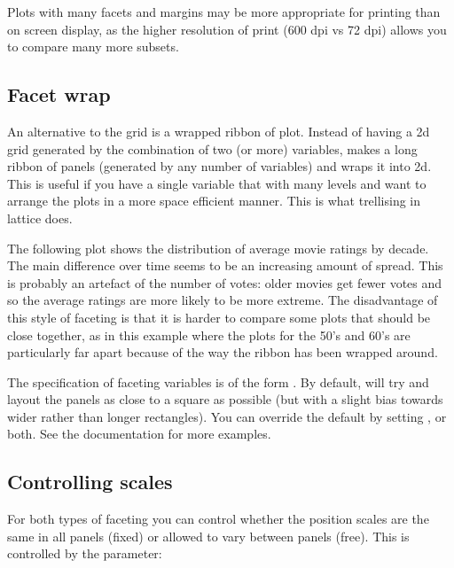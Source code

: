 Plots with many facets and margins may be more appropriate for printing than on screen display, as the higher resolution of print (600 dpi vs 72 dpi) allows you to compare many more subsets.

\subsection{Facet wrap}
\label{sub:facet_wrap}

An alternative to the grid is a wrapped ribbon of plot.  Instead of having a 2d grid generated by the combination of two (or more) variables,  makes a long ribbon of panels (generated by any number of variables) and wraps it into 2d.  This is useful if you have a single variable that with many levels and want to arrange the plots in a more space efficient manner.  This is what trellising in lattice does.

The following plot shows the distribution of average movie ratings by decade.  The main difference over time seems to be an increasing amount of spread.  This is probably an artefact of the number of votes: older movies get fewer votes and so the average ratings are more likely to be more extreme.  The disadvantage of this style of faceting is that it is harder to compare some plots that should be close together, as in this example where the plots for the 50's and 60's are particularly far apart because of the way the ribbon has been wrapped around.

% 


The specification of faceting variables is of the form .  By default,  will try and layout the panels as close to a square as possible (but with a slight bias towards wider rather than longer rectangles).  You can override the default by setting ,  or both.  See the documentation for more examples.

\subsection{Controlling scales}
\label{sub:controlling_scales}

For both types of faceting you can control whether the position scales are the same in all panels (fixed) or allowed to vary between panels (free).  This is controlled by the  parameter:

